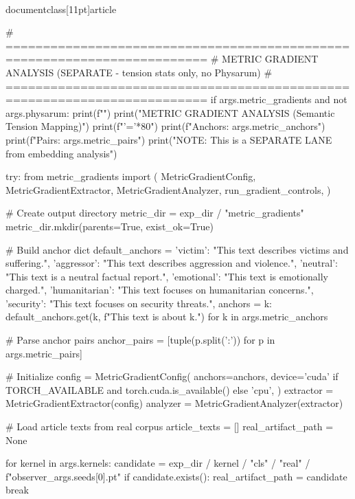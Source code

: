 \\documentclass[11pt]{article}
\begin{document}
\begin{CodeBlock}
    # =========================================================================
    # METRIC GRADIENT ANALYSIS (SEPARATE - tension stats only, no Physarum)
    # =========================================================================
    if args.metric_gradients and not args.physarum:
        print(f"")
        print("METRIC GRADIENT ANALYSIS (Semantic Tension Mapping)")
        print(f"{'='*80}")
        print(f"Anchors: {args.metric_anchors}")
        print(f"Pairs: {args.metric_pairs}")
        print("NOTE: This is a SEPARATE LANE from embedding analysis")
        
        try:
            from metric_gradients import (
                MetricGradientConfig,
                MetricGradientExtractor,
                MetricGradientAnalyzer,
                run_gradient_controls,
            )
            
            # Create output directory
            metric_dir = exp_dir / "metric_gradients"
            metric_dir.mkdir(parents=True, exist_ok=True)
            
            # Build anchor dict
            default_anchors = {
                'victim': "This text describes victims and suffering.",
                'aggressor': "This text describes aggression and violence.",
                'neutral': "This text is a neutral factual report.",
                'emotional': "This text is emotionally charged.",
                'humanitarian': "This text focuses on humanitarian concerns.",
                'security': "This text focuses on security threats.",
            }
            anchors = {k: default_anchors.get(k, f"This text is about {k}.") 
                      for k in args.metric_anchors}
            
            # Parse anchor pairs
            anchor_pairs = [tuple(p.split(':')) for p in args.metric_pairs]
            
            # Initialize
            config = MetricGradientConfig(
                anchors=anchors,
                device='cuda' if TORCH_AVAILABLE and torch.cuda.is_available() else 'cpu',
            )
            extractor = MetricGradientExtractor(config)
            analyzer = MetricGradientAnalyzer(extractor)
            
            # Load article texts from real corpus
            article_texts = []
            real_artifact_path = None
            
            for kernel in args.kernels:
                candidate = exp_dir / kernel / "cls" / "real" / f"observer_{args.seeds[0]}.pt"
                if candidate.exists():
                    real_artifact_path = candidate
                    break
            

\end{CodeBlock}
\end{document}
